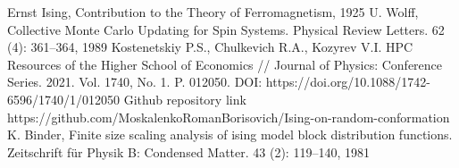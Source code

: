 \documentclass[a4paper,12pt]{article}
\begin{document}
\begin{thebibliography}{7}
		Ernst Ising, Contribution to the Theory of Ferromagnetism, 1925
		U. Wolff, Collective Monte Carlo Updating for Spin Systems. Physical Review Letters. 62 (4): 361–364, 1989
		Kostenetskiy P.S., Chulkevich R.A., Kozyrev V.I. HPC Resources of the Higher School of Economics // Journal of Physics: Conference Series. 2021. Vol. 1740, No. 1. P. 012050. DOI: https://doi.org/10.1088/1742-6596/1740/1/012050
		Github repository link https://github.com/MoskalenkoRomanBorisovich/Ising-on-random-conformation
		K. Binder, Finite size scaling analysis of ising model block distribution functions. Zeitschrift für Physik B: Condensed Matter. 43 (2): 119–140, 1981

\end{thebibliography}
\end{document}
